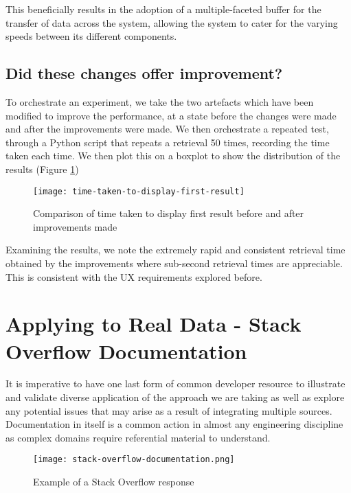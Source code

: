 This beneficially results in the adoption of a multiple-faceted buffer for the transfer of data across the system, allowing the system to cater for the varying speeds between its different components.

\subsection{Did these changes offer improvement?}

To orchestrate an experiment, we take the two artefacts which have been modified to improve the performance, at a state before the changes were made and after the improvements were made. We then orchestrate a repeated test, through a Python script that repeats a retrieval 50 times, recording the time taken each time. We then plot this on a boxplot to show the distribution of the results (Figure \ref{fig:time-taken-to-display-first-result})

\begin{figure}[h!]
	\centering
	\texttt{[image: time-taken-to-display-first-result]}
	\caption{Comparison of time taken to display first result before and after improvements made}
	\label{fig:time-taken-to-display-first-result}
\end{figure}

Examining the results, we note the extremely rapid and consistent retrieval time obtained by the improvements where sub-second retrieval times are appreciable. This is consistent with the UX requirements explored before. 

\section{Applying to Real Data - Stack Overflow Documentation}

It is imperative to have one last form of common developer resource to illustrate and validate diverse application of the approach we are taking as well as explore any potential issues that may arise as a result of integrating multiple sources. Documentation in itself is a common action in almost any engineering discipline as complex domains require referential material to understand.

\begin{figure}[h!]
	\centering
	\texttt{[image: stack-overflow-documentation.png]}
	\caption{Example of a Stack Overflow response}
	\label{fig:stackOverflowDocSite}
\end{figure}

